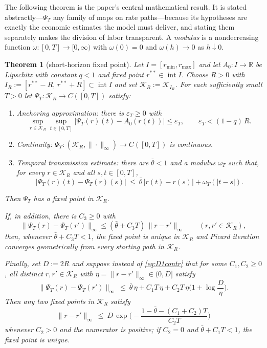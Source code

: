 \documentclass[11pt]{article}
\newtheorem{theorem}{Theorem}[section]
\theoremstyle{definition}
\theoremstyle{remark}
\newcommand{\R}{\mathbb{R}}
\newcommand{\Kcal}{\mathcal{K}}
\newcommand{\psit}{\Psi_T}
\begin{document}
The following theorem is the paper's central mathematical result. It
is stated abstractly---$\psit$ any family of maps on rate
paths---because its hypotheses are exactly the economic estimates the
model must deliver, and stating them separately makes the division of
labor transparent. A \emph{modulus} is a nondecreasing function
$\omega:[0,T]\to[0,\infty)$ with $\omega(0)=0$ and
$\omega(h)\to0$ as $h\downarrow0$.

\begin{theorem}[short-horizon fixed point]\label{thm:main}
Let $I=[r_{\min},r_{\max}]$ and let $A_0:I\to\R$ be Lipschitz with
constant $q<1$ and fixed point $r^{**}\in\operatorname{int}I$. Choose
$R>0$ with $I_R:=[r^{**}-R,\,r^{**}+R]\subset\operatorname{int}I$ and
set $\Kcal_R:=\Kcal_{I_R}$. For each sufficiently small $T>0$ let
$\psit:\Kcal_R\to C([0,T])$ satisfy:
\begin{enumerate}[label=\textup{(H\arabic*)},leftmargin=3.2em]
\item \emph{Anchoring approximation:} there is $\varepsilon_T\ge0$
with
\[
\sup_{r\in\Kcal_R}\sup_{t\in[0,T]}|\psit(r)(t)-A_0(r(t))|
\le\varepsilon_T,
\qquad \varepsilon_T<(1-q)\,R .
\]
\item \emph{Continuity:} $\psit:(\Kcal_R,\|\cdot\|_\infty)\to
C([0,T])$ is continuous.
\item \emph{Temporal transmission estimate:} there are
$\bar\theta<1$ and a modulus $\omega_T$ such that, for every
$r\in\Kcal_R$ and all $s,t\in[0,T]$,
\begin{equation}\label{eq:temporal}
|\psit(r)(t)-\psit(r)(s)|\ \le\
\bar\theta\,|r(t)-r(s)|+\omega_T(|t-s|).
\end{equation}
\end{enumerate}
Then $\psit$ has a fixed point in $\Kcal_R$.

If, in addition, there is $C_3\ge0$ with
\begin{equation}\label{eq:D1contr}
\|\psit(r)-\psit(r')\|_\infty\le(\bar\theta+C_3T)\,\|r-r'\|_\infty
\qquad(r,r'\in\Kcal_R),
\end{equation}
then, whenever $\bar\theta+C_3T<1$, the fixed point is unique in
$\Kcal_R$ and Picard iteration converges geometrically from every
starting path in $\Kcal_R$.

Finally, set $D:=2R$ and suppose instead of \eqref{eq:D1contr} that
for some $C_1,C_2\ge0$, all distinct $r,r'\in\Kcal_R$ with
$\eta=\|r-r'\|_\infty\in(0,D]$ satisfy
\begin{equation}\label{eq:D1prime}
\|\psit(r)-\psit(r')\|_\infty\ \le\
\bar\theta\,\eta+C_1T\,\eta+C_2T\,\eta\Big(1+\log\frac{D}{\eta}\Big).
\end{equation}
Then any two fixed points in $\Kcal_R$ satisfy
\begin{equation}\label{eq:ambiguity}
\|r-r'\|_\infty\ \le\
D\,\exp\!\Big(-\frac{1-\bar\theta-(C_1+C_2)T}{C_2T}\Big)
\end{equation}
whenever $C_2>0$ and the numerator is positive; if $C_2=0$ and
$\bar\theta+C_1T<1$, the fixed point is unique.
\end{theorem}
\end{document}
